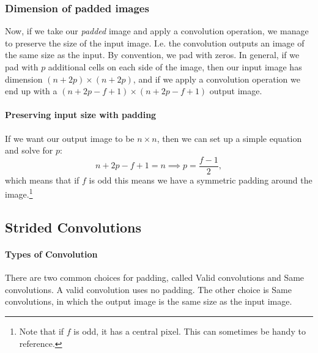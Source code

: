\documentclass[12pt]{article}
\begin{document}
\subsubsection{Dimension of padded images}
Now, if we take our \emph{padded} image and apply a convolution operation, we manage
to preserve the size of the input image. I.e. the convolution outputs an image of the same size
as the input. By convention, we pad with zeros. In general, if we pad with $p$ additional cells
on each side of the image, then our input image has dimension $(n+2p) \times (n+2p)$, and if we apply a convolution
operation we end up with a $(n+2p-f+1) \times (n+2p-f+1)$ output image. 

\paragraph{Preserving input size with padding}
If we want
our output image to be $n \times n$, then we can set up a simple equation and solve for $p$:
\begin{equation*}   n + 2p - f + 1 = n \implies p = \frac{f-1}{2}, \end{equation*}
which means that if $f$ is odd this means we have a symmetric padding around the image.\footnote{Note that if $f$ is odd, it has a central pixel. This can sometimes be handy to reference.}

\subsection{Strided Convolutions}

\paragraph{Types of Convolution} There are two common choices for padding,
called Valid convolutions and Same convolutions. A valid convolution
uses no padding. The other choice is Same convolutions, in which the output
image is the same size as the input image.
\end{document}
